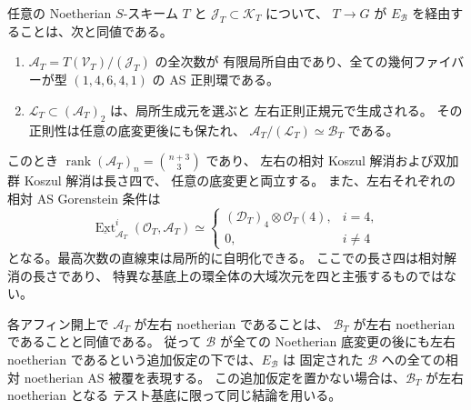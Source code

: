 \begin{theorem}[二次被覆の相対有限判定]
任意の Noetherian $S$-スキーム $T$ と
$\mathcal J_T\subset\mathcal K_T$ について、
$T\to G$ が $E_{\mathcal B}$ を経由することは、次と同値である。
\begin{enumerate}[label=(\alph*)]
\item $\mathcal A_T=T(\mathcal V_T)/(\mathcal J_T)$ の全次数が
有限局所自由であり、全ての幾何ファイバーが型 $(1,4,6,4,1)$ の
AS 正則環である。
\item $\mathcal L_T\subset(\mathcal A_T)_2$ は、局所生成元を選ぶと
左右正則正規元で生成される。
その正則性は任意の底変更後にも保たれ、
$\mathcal A_T/(\mathcal L_T)\simeq\mathcal B_T$ である。
\end{enumerate}
このとき $\operatorname{rank}(\mathcal A_T)_n=\binom{n+3}{3}$ であり、
左右の相対 Koszul 解消および双加群 Koszul 解消は長さ四で、
任意の底変更と両立する。
また、左右それぞれの相対 AS Gorenstein 条件は
\[
 \underline{\operatorname{Ext}}_{\mathcal A_T}^i
       (\mathcal O_T,\mathcal A_T)
 \simeq
 \begin{cases}
  (\mathcal D_T)_4\otimes\mathcal O_T(4),&i=4,\\
  0,&i\ne4
 \end{cases}
\]
となる。最高次数の直線束は局所的に自明化できる。
ここでの長さ四は相対解消の長さであり、
特異な基底上の環全体の大域次元を四と主張するものではない。

各アフィン開上で $\mathcal A_T$ が左右 noetherian であることは、
$\mathcal B_T$ が左右 noetherian であることと同値である。
従って $\mathcal B$ が全ての Noetherian 底変更の後にも左右 noetherian
であるという追加仮定の下では、$E_{\mathcal B}$ は
固定された $\mathcal B$ への全ての相対 noetherian AS 被覆を表現する。
この追加仮定を置かない場合は、$\mathcal B_T$ が左右 noetherian となる
テスト基底に限って同じ結論を用いる。
\end{theorem}
